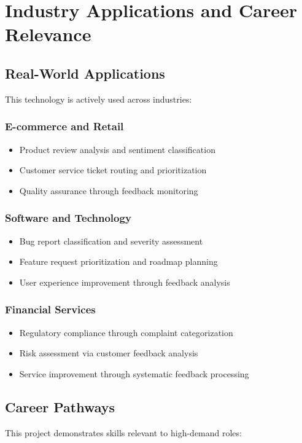\documentclass[11pt,a4paper]{article}
\begin{document}
\section{Industry Applications and Career Relevance}

\subsection{Real-World Applications}
This technology is actively used across industries:

\subsubsection{E-commerce and Retail}
\begin{itemize}
  \item Product review analysis and sentiment classification
  \item Customer service ticket routing and prioritization
  \item Quality assurance through feedback monitoring
\end{itemize}

\subsubsection{Software and Technology}
\begin{itemize}
  \item Bug report classification and severity assessment
  \item Feature request prioritization and roadmap planning
  \item User experience improvement through feedback analysis
\end{itemize}

\subsubsection{Financial Services}
\begin{itemize}
  \item Regulatory compliance through complaint categorization
  \item Risk assessment via customer feedback analysis
  \item Service improvement through systematic feedback processing
\end{itemize}

\subsection{Career Pathways}
This project demonstrates skills relevant to high-demand roles:
\end{document}
